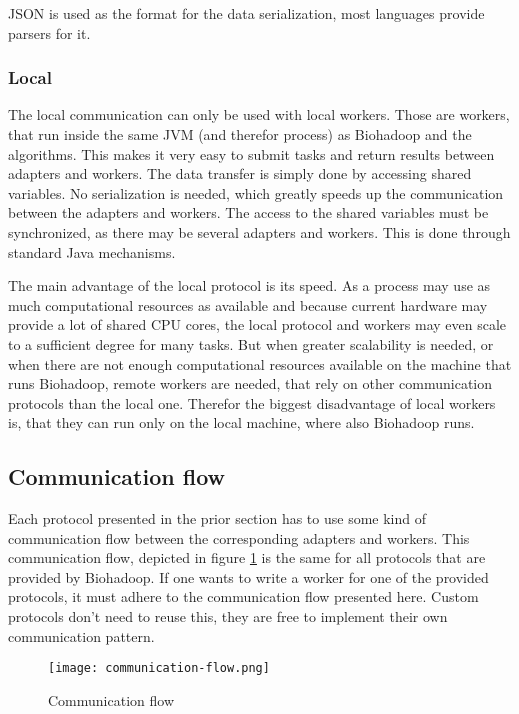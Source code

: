       JSON is used as the format for the data serialization, most languages provide parsers for it.
    \subsubsection{Local}
      The local communication can only be used with local workers. Those are workers, that run inside the same JVM (and therefor process) as Biohadoop and the algorithms. This makes it very easy to submit tasks and return results between adapters and workers. The data transfer is simply done by accessing shared variables. No serialization is needed, which greatly speeds up the communication between the adapters and workers. The access to the shared variables must be synchronized, as there may be several adapters and workers. This is done through standard Java mechanisms.
      
      The main advantage of the local protocol is its speed. As a process may use as much computational resources as available and because current hardware may provide a lot of shared CPU cores, the local protocol and workers may even scale to a sufficient degree for many tasks. But when greater scalability is needed, or when there are not enough computational resources available on the machine that runs Biohadoop, remote workers are needed, that rely on other communication protocols than the local one. Therefor the biggest disadvantage of local workers is, that they can run only on the local machine, where also Biohadoop runs.
      
  \subsection{Communication flow}
  \label{chap:impl:communication-flow}
    Each protocol presented in the prior section has to use some kind of communication flow between the corresponding adapters and workers. This communication flow, depicted in figure \ref{fig:communication-flow} is the same for all protocols that are provided by Biohadoop. If one wants to write a worker for one of the provided protocols, it must adhere to the communication flow presented here. Custom protocols don't need to reuse this, they are free to implement their own communication pattern.
    
    \begin{figure}[ht!]
      \centering
      \texttt{[image: communication-flow.png]}
      \caption{Communication flow}
      \label{fig:communication-flow}
    \end{figure}
    
